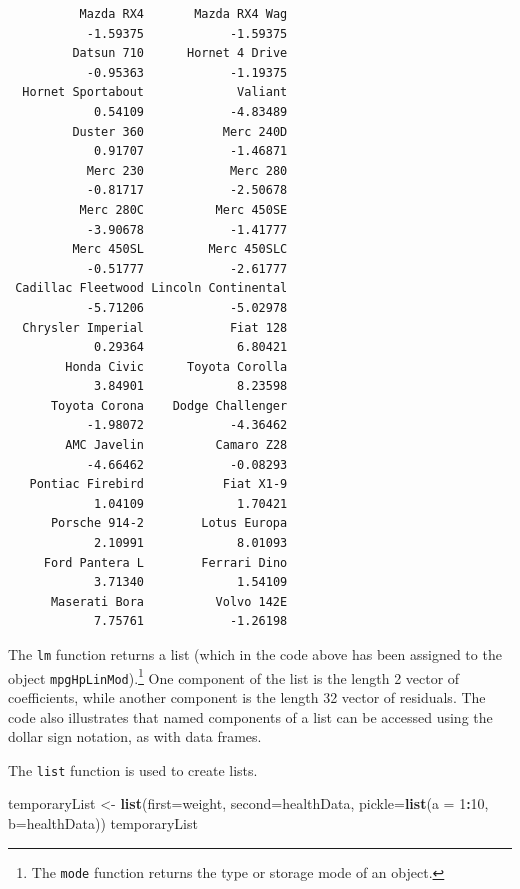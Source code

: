 \documentclass[
]{krantz}
\makeatletter
\newenvironment{Shaded}{\begin{snugshade}}{\end{snugshade}}
\newcommand{\DataTypeTok}[1]{\textcolor[rgb]{0.27,0.27,0.27}{#1}}
\newcommand{\DecValTok}[1]{\textcolor[rgb]{0.06,0.06,0.06}{#1}}
\newcommand{\KeywordTok}[1]{\textcolor[rgb]{0.27,0.27,0.27}{\textbf{#1}}}
\newcommand{\NormalTok}[1]{#1}
\newcommand{\OperatorTok}[1]{\textcolor[rgb]{0.43,0.43,0.43}{\textbf{#1}}}
\newcommand{\StringTok}[1]{\textcolor[rgb]{0.5,0.5,0.5}{#1}}
\newenvironment{kframe}{%
\medskip{}
\setlength{\fboxsep}{.8em}
 \def\at@end@of@kframe{}%
 \ifinner\ifhmode%
  \def\at@end@of@kframe{\end{minipage}}%
  \begin{minipage}{\columnwidth}%
 \fi\fi%
 \def\FrameCommand##1{\hskip\@totalleftmargin \hskip-\fboxsep
 \colorbox{shadecolor}{##1}\hskip-\fboxsep
     \hskip-\linewidth \hskip-\@totalleftmargin \hskip\columnwidth}%
 \MakeFramed {\advance\hsize-\width
   \@totalleftmargin\z@ \linewidth\hsize
   \@setminipage}}%
 {\par\unskip\endMakeFramed%
 \at@end@of@kframe}
\renewenvironment{Shaded}{\begin{kframe}}{\end{kframe}}
\makeatother
\begin{document}
\begin{Shaded}
\end{Shaded}

\begin{verbatim}
          Mazda RX4       Mazda RX4 Wag 
           -1.59375            -1.59375 
         Datsun 710      Hornet 4 Drive 
           -0.95363            -1.19375 
  Hornet Sportabout             Valiant 
            0.54109            -4.83489 
         Duster 360           Merc 240D 
            0.91707            -1.46871 
           Merc 230            Merc 280 
           -0.81717            -2.50678 
          Merc 280C          Merc 450SE 
           -3.90678            -1.41777 
         Merc 450SL         Merc 450SLC 
           -0.51777            -2.61777 
 Cadillac Fleetwood Lincoln Continental 
           -5.71206            -5.02978 
  Chrysler Imperial            Fiat 128 
            0.29364             6.80421 
        Honda Civic      Toyota Corolla 
            3.84901             8.23598 
      Toyota Corona    Dodge Challenger 
           -1.98072            -4.36462 
        AMC Javelin          Camaro Z28 
           -4.66462            -0.08293 
   Pontiac Firebird           Fiat X1-9 
            1.04109             1.70421 
      Porsche 914-2        Lotus Europa 
            2.10991             8.01093 
     Ford Pantera L        Ferrari Dino 
            3.71340             1.54109 
      Maserati Bora          Volvo 142E 
            7.75761            -1.26198 
\end{verbatim}

The \texttt{lm} function returns a list (which in the code above has been assigned to the object \texttt{mpgHpLinMod}).\footnote{The \texttt{mode} function returns the type or storage mode of an object.} One component of the list is the length 2 vector of coefficients, while another component is the length 32 vector of residuals. The code also illustrates that named components of a list can be accessed using the dollar sign notation, as with data frames.

The \texttt{list} function is used to create lists.

\begin{Shaded}
\begin{Highlighting}[]
\NormalTok{temporaryList \textless{}{-}}\StringTok{ }\KeywordTok{list}\NormalTok{(}\DataTypeTok{first=}\NormalTok{weight, }\DataTypeTok{second=}\NormalTok{healthData,}
                      \DataTypeTok{pickle=}\KeywordTok{list}\NormalTok{(}\DataTypeTok{a =} \DecValTok{1}\OperatorTok{:}\DecValTok{10}\NormalTok{, }\DataTypeTok{b=}\NormalTok{healthData))}
\NormalTok{temporaryList}
\end{Highlighting}
\end{Shaded}
\end{document}
